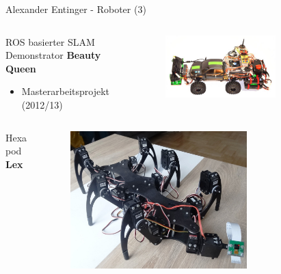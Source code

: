 \documentclass{beamer}
\begin{document}
\begin{frame}{Alexander Entinger - Roboter (3)}
	\begin{columns}
		\begin{column}{0.5\textwidth}
			\begin{large}ROS basierter SLAM Demonstrator \textbf{Beauty Queen}\end{large}
			\begin{itemize}
				\item Masterarbeitsprojekt (2012/13)
			\end{itemize}
		\end{column}
		\begin{column}{0.5\textwidth}
			\begin{figure}[H]
				\centering
				\includegraphics[width=0.7\textwidth]{./images/robot-beauty-queen.jpg}
				\label{fig:robot-beauty-queen}
			\end{figure}
		\end{column}
	\end{columns}
	
	\begin{columns}
		\begin{column}{0.5\textwidth}
			\begin{large}Hexapod \textbf{Lex}\end{large}
		\end{column}
		\begin{column}{0.5\textwidth}
			\begin{figure}[H]
				\centering
				\includegraphics[width=0.7\textwidth]{./images/robot-lex.jpg}
				\label{fig:robot-lex}
			\end{figure}
		\end{column}
	\end{columns}
\end{frame}
\end{document}
